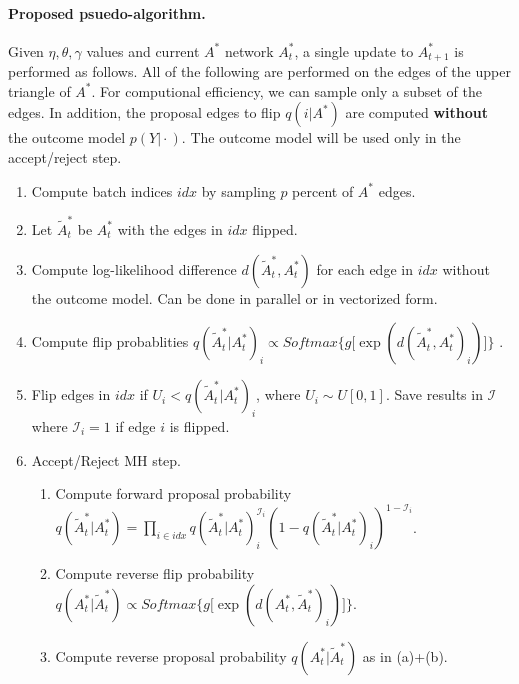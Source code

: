 \documentclass[12pt]{article}
\begin{document}
        \paragraph{Proposed psuedo-algorithm.} 
        Given $\eta,\theta,\gamma$ values and current $A^\ast$ network $A^\ast_t$,
        a single update to $A^\ast_{t+1}$ is performed as follows.
        All of the following are performed on the edges of the upper triangle of $A^\ast$.
        For computional efficiency, we can sample only a subset of the edges.
        In addition, the proposal edges to flip $q(i \vert A^\ast)$ are 
        computed \textbf{without} the outcome model $p(Y \vert \cdot )$. 
        The outcome model will be used only in the accept/reject step.
        \begin{enumerate}
            \item Compute batch indices $idx$ by sampling $p$ percent of $A^\ast$ edges.
            \item Let $\widetilde{A}^\ast_t$ be $A^\ast_t$ with the edges in $idx$ flipped.
            \item Compute log-likelihood difference $d(\widetilde{A}^\ast_t,A^\ast_t)$ for each
                    edge in $idx$ without the outcome model.
                    Can be done in parallel or in vectorized form.
            \item Compute flip probablities
                 $q(\widetilde{A}^\ast_t \vert A^\ast_t)_i \propto Softmax\big\{g\big[\exp(d(\widetilde{A}^\ast_t,A^\ast_t)_i)\big]\big\}$ .  
            \item Flip edges in $idx$ if $U_i < q(\widetilde{A}^\ast_t \vert A^\ast_t)_i$, 
                    where $U_i \sim U[0,1]$. 
                    Save results in $\mathcal{I}$ where $\mathcal{I}_i = 1$ if edge $i$ is flipped.
            \item Accept/Reject MH step.
            \begin{enumerate}
                \item Compute forward proposal probability 
                $q(\widetilde{A}^\ast_t \vert A^\ast_t) = 
                    \prod_{i \in idx}q(\widetilde{A}^\ast_t \vert A^\ast_t)_i^{\mathcal{I}_i}
                                            (1-q(\widetilde{A}^\ast_t \vert A^\ast_t)_i)^{1-\mathcal{I}_i}$. 
                \item Compute reverse flip probability 
                        $q(A^\ast_t \vert \widetilde{A}^\ast_t) \propto Softmax\big\{g\big[\exp(d(A^\ast_t, \widetilde{A}^\ast_t)_i)\big]\big\}$.
                \item Compute reverse proposal probability $q(A^\ast_t \vert \widetilde{A}^\ast_t)$ as in (a)+(b).

\end{enumerate}
\end{enumerate}
\end{document}

